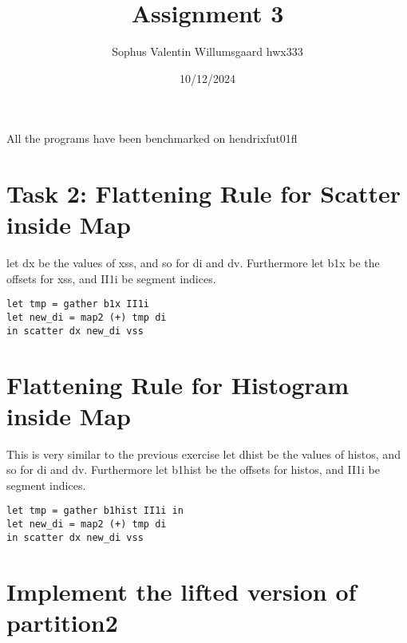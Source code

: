 \documentclass[a4paper,12pt]{article}
\begin{document}
\title{Assignment 3}
\author{Sophus Valentin Willumsgaard hwx333}
\date{10/12/2024}
\maketitle

\tableofcontents %
\newpage %
All the programs have been benchmarked on hendrixfut01fl
\section{Task 2: Flattening Rule for Scatter inside Map }
let dx be the values of xss, and so for di and dv.
Furthermore let b1x be the offsets for xss, and II1i be segment indices.
\begin{lstlisting}
let tmp = gather b1x II1i
let new_di = map2 (+) tmp di
in scatter dx new_di vss
\end{lstlisting}
\section{Flattening Rule for Histogram inside Map}
This is very similar to the previous exercise
let dhist be the values of histos, and so for di and dv.
Furthermore let b1hist be the offsets for histos, and II1i be segment indices.
\begin{lstlisting}
let tmp = gather b1hist II1i in
let new_di = map2 (+) tmp di
in scatter dx new_di vss
\end{lstlisting}
\section{Implement the lifted version of \textmd{partition2}}
\end{document}
